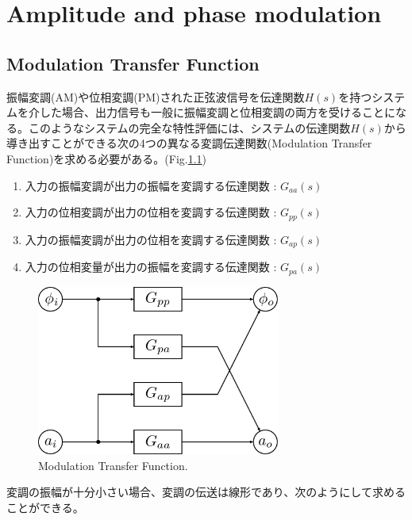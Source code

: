 \documentclass[book]{jlreq}
\begin{document}
\chapter{Amplitude and phase modulation}
\section{Modulation Transfer Function}
%
振幅変調(AM)や位相変調(PM)された正弦波信号を伝達関数$H(s)$を持つシステムを介した場合、出力信号も一般に振幅変調と位相変調の両方を受けることになる。このようなシステムの完全な特性評価には、システムの伝達関数$H(s)$から導き出すことができる次の4つの異なる変調伝達関数(Modulation Transfer Function)を求める必要がある。(Fig.\ref{fig:MTF})
%
\begin{enumerate}
    \item 入力の振幅変調が出力の振幅を変調する伝達関数 : $G_{aa}(s)$
    \item 入力の位相変調が出力の位相を変調する伝達関数 : $G_{pp}(s)$
    \item 入力の振幅変調が出力の位相を変調する伝達関数 : $G_{ap}(s)$
    \item 入力の位相変量が出力の振幅を変調する伝達関数 : $G_{pa}(s)$
\end{enumerate}
%
\begin{figure}[hbt]
    \begin{center}
        \includegraphics[width=8cm,clip]{figs/Mod_Trans_Func.pdf}
        \caption{Modulation Transfer Function.}
        \label{fig:MTF}
    \end{center}
\end{figure}
%
変調の振幅が十分小さい場合、変調の伝送は線形であり、次のようにして求めることができる。
\end{document}
